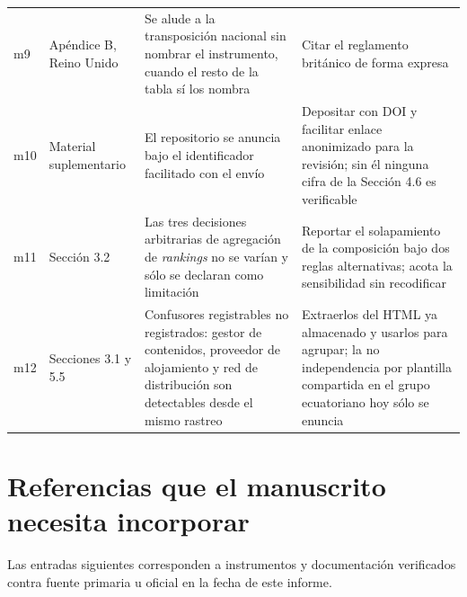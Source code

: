 \documentclass[11pt,a4paper]{article}
\begin{document}
\begin{longtable}{@{}L{0.8cm}L{2.8cm}L{6.4cm}L{4.2cm}@{}}
	\addlinespace
	m9 & Ap\'endice B, Reino Unido & Se alude a la transposici\'on nacional sin nombrar el instrumento, cuando el resto de la tabla s\'i los nombra & Citar el reglamento brit\'anico de forma expresa \\
	\addlinespace
	m10 & Material suplementario & El repositorio se anuncia bajo el identificador facilitado con el env\'io & Depositar con DOI y facilitar enlace anonimizado para la revisi\'on; sin \'el ninguna cifra de la Secci\'on 4.6 es verificable \\
	\addlinespace
	m11 & Secci\'on 3.2 & Las tres decisiones arbitrarias de agregaci\'on de \emph{rankings} no se var\'ian y s\'olo se declaran como limitaci\'on & Reportar el solapamiento de la composici\'on bajo dos reglas alternativas; acota la sensibilidad sin recodificar \\
	\addlinespace
	m12 & Secciones 3.1 y 5.5 & Confusores registrables no registrados: gestor de contenidos, proveedor de alojamiento y red de distribuci\'on son detectables desde el mismo rastreo & Extraerlos del HTML ya almacenado y usarlos para agrupar; la no independencia por plantilla compartida en el grupo ecuatoriano hoy s\'olo se enuncia \\
	\bottomrule
\end{longtable}
\normalsize

\section{Referencias que el manuscrito necesita incorporar}

Las entradas siguientes corresponden a instrumentos y documentaci\'on verificados contra fuente primaria u oficial en la fecha de este informe.
\end{document}
